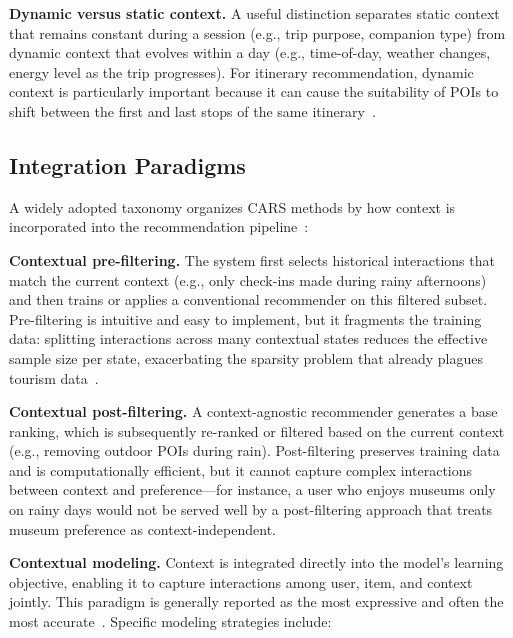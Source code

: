 \textbf{Dynamic versus static context.} A useful distinction separates static context that remains constant during a session (e.g., trip purpose, companion type) from dynamic context that evolves within a day (e.g., time-of-day, weather changes, energy level as the trip progresses). For itinerary recommendation, dynamic context is particularly important because it can cause the suitability of POIs to shift between the first and last stops of the same itinerary~\cite{adomavicius2022cars}.

\subsection{Integration Paradigms}
\label{sec:sota-cars-paradigms}

A widely adopted taxonomy organizes CARS methods by how context is incorporated into the recommendation pipeline~\cite{adomavicius2005cars, villegas2018cars}:

\textbf{Contextual pre-filtering.} The system first selects historical interactions that match the current context (e.g., only check-ins made during rainy afternoons) and then trains or applies a conventional recommender on this filtered subset. Pre-filtering is intuitive and easy to implement, but it fragments the training data: splitting interactions across many contextual states reduces the effective sample size per state, exacerbating the sparsity problem that already plagues tourism data~\cite{villegas2018cars, raza2019cars}.

\textbf{Contextual post-filtering.} A context-agnostic recommender generates a base ranking, which is subsequently re-ranked or filtered based on the current context (e.g., removing outdoor POIs during rain). Post-filtering preserves training data and is computationally efficient, but it cannot capture complex interactions between context and preference---for instance, a user who enjoys museums only on rainy days would not be served well by a post-filtering approach that treats museum preference as context-independent.

\textbf{Contextual modeling.} Context is integrated directly into the model's learning objective, enabling it to capture interactions among user, item, and context jointly. This paradigm is generally reported as the most expressive and often the most accurate~\cite{adomavicius2022cars, mateos2025carsslr}. Specific modeling strategies include:

